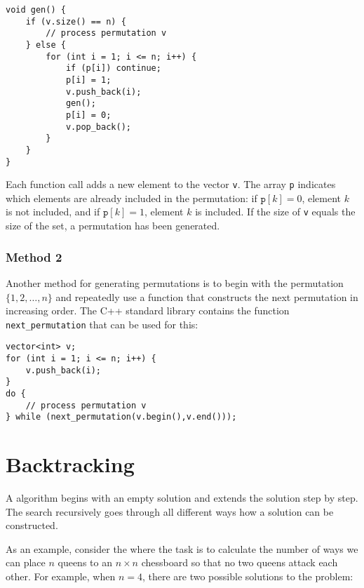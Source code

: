 \begin{lstlisting}
void gen() {
    if (v.size() == n) {
        // process permutation v
    } else {
        for (int i = 1; i <= n; i++) {
            if (p[i]) continue;
            p[i] = 1;
            v.push_back(i);
            gen();
            p[i] = 0;
            v.pop_back();
        }
    }
}
\end{lstlisting}

Each function call adds a new element to
the vector \texttt{v}.
The array \texttt{p} indicates which
elements are already included in the permutation:
if $\texttt{p}[k]=0$, element $k$ is not included,
and if $\texttt{p}[k]=1$, element $k$ is included.
If the size of \texttt{v} equals the size of the set,
a permutation has been generated.

\subsubsection{Method 2}


Another method for generating permutations
is to begin with the permutation
$\{1,2,\ldots,n\}$ and repeatedly
use a function that constructs the next permutation
in increasing order.
The C++ standard library contains the function
\texttt{next\_permutation} that can be used for this:

\begin{lstlisting}
vector<int> v;
for (int i = 1; i <= n; i++) {
    v.push_back(i);
}
do {
    // process permutation v
} while (next_permutation(v.begin(),v.end()));
\end{lstlisting}

\section{Backtracking}


A  algorithm
begins with an empty solution
and extends the solution step by step.
The search recursively
goes through all different ways how
a solution can be constructed.


As an example, consider the 
where the task is to calculate the number
of ways we can place $n$ queens to
an $n \times n$ chessboard so that
no two queens attack each other.
For example, when $n=4$,
there are two possible solutions to the problem:


